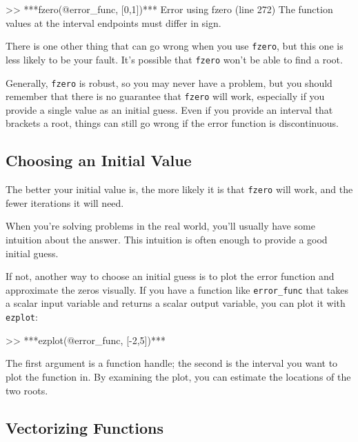 \begin{code}
>> ***fzero(@error_func, [0,1])***
Error using fzero (line 272)
The function values at the interval endpoints must differ in sign.
\end{code}


There is one other thing that can go wrong when you use \lstinline{fzero}, but
this one is less likely to be your fault.  It's possible that \lstinline{fzero}
won't be able to find a root.

Generally, \lstinline{fzero} is robust, so you may never have a problem, but you should remember that there is no guarantee that \lstinline{fzero} will work, especially \linebreak if you provide a single value as an initial guess.  Even if you provide an interval that brackets a root, things can still go wrong if the error function is discontinuous.


\subsection{Choosing an Initial Value}

The better your initial value is, the more likely it is that
\lstinline{fzero} will work, and the fewer iterations it will
need.

When you're solving problems in the real world, you'll usually
have some intuition about the answer.  This intuition is often enough
to provide \linebreak a good initial guess.


If not, another way to choose an initial guess is to plot the error function and
approximate the zeros visually.  If you have a function like
\lstinline{error_func} that takes a scalar input variable and returns
a scalar output variable, you can plot it with \lstinline{ezplot}:

\begin{code}
>> ***ezplot(@error_func, [-2,5])***
\end{code}

The first argument is a function handle; the second is the interval you want to plot the function in.
By examining the plot, you can estimate the locations of the two roots.


\subsection{Vectorizing Functions}

